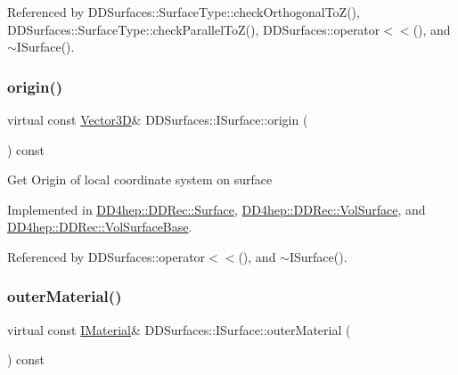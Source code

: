 Referenced by D\+D\+Surfaces\+::\+Surface\+Type\+::check\+Orthogonal\+To\+Z(), D\+D\+Surfaces\+::\+Surface\+Type\+::check\+Parallel\+To\+Z(), D\+D\+Surfaces\+::operator$<$$<$(), and $\sim$\+I\+Surface().

\hypertarget{class_d_d_surfaces_1_1_i_surface_a552cf76ca76154d0a6d9709d826b57f4}{}\label{class_d_d_surfaces_1_1_i_surface_a552cf76ca76154d0a6d9709d826b57f4} 
\subsubsection{\texorpdfstring{origin()}{origin()}}
{\footnotesize\ttfamily virtual const \hyperlink{class_d_d_surfaces_1_1_vector3_d}{Vector3D}\& D\+D\+Surfaces\+::\+I\+Surface\+::origin (\begin{DoxyParamCaption}{ }\end{DoxyParamCaption}) const\hspace{0.3cm}{\ttfamily [pure virtual]}}

Get Origin of local coordinate system on surface 

Implemented in \hyperlink{class_d_d4hep_1_1_d_d_rec_1_1_surface_a4910106fc066884c4a53d9fbab52707e}{D\+D4hep\+::\+D\+D\+Rec\+::\+Surface}, \hyperlink{class_d_d4hep_1_1_d_d_rec_1_1_vol_surface_ae17a8846276ccf5ad449f3c0106bde85}{D\+D4hep\+::\+D\+D\+Rec\+::\+Vol\+Surface}, and \hyperlink{class_d_d4hep_1_1_d_d_rec_1_1_vol_surface_base_a057675c3f4a66116703a467df8c348fe}{D\+D4hep\+::\+D\+D\+Rec\+::\+Vol\+Surface\+Base}.



Referenced by D\+D\+Surfaces\+::operator$<$$<$(), and $\sim$\+I\+Surface().

\hypertarget{class_d_d_surfaces_1_1_i_surface_a49dfd8a5eef419226abc675b8d1126a5}{}\label{class_d_d_surfaces_1_1_i_surface_a49dfd8a5eef419226abc675b8d1126a5} 
\subsubsection{\texorpdfstring{outer\+Material()}{outerMaterial()}}
{\footnotesize\ttfamily virtual const \hyperlink{class_d_d_surfaces_1_1_i_material}{I\+Material}\& D\+D\+Surfaces\+::\+I\+Surface\+::outer\+Material (\begin{DoxyParamCaption}{ }\end{DoxyParamCaption}) const\hspace{0.3cm}{\ttfamily [pure virtual]}}



